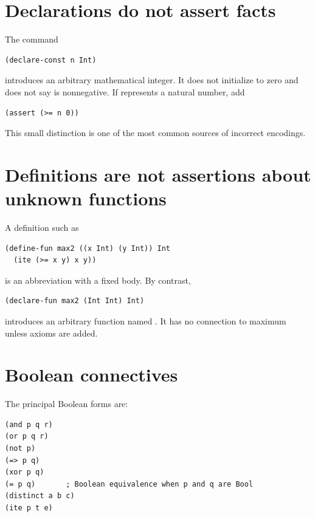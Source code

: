 \documentclass[10pt,letterpaper,oneside]{report}
\newcommand{\code}[1]{\texttt{\detokenize{#1}}}
\begin{document}
\section{Declarations do not assert facts}

The command

\begin{lstlisting}[language=SMTLib]
(declare-const n Int)
\end{lstlisting}

introduces an arbitrary mathematical integer. It does not initialize \code{n} to zero and does not say \code{n} is nonnegative. If \code{n} represents a natural number, add

\begin{lstlisting}[language=SMTLib]
(assert (>= n 0))
\end{lstlisting}

This small distinction is one of the most common sources of incorrect encodings.

\section{Definitions are not assertions about unknown functions}

A definition such as

\begin{lstlisting}[language=SMTLib]
(define-fun max2 ((x Int) (y Int)) Int
  (ite (>= x y) x y))
\end{lstlisting}

is an abbreviation with a fixed body. By contrast,

\begin{lstlisting}[language=SMTLib]
(declare-fun max2 (Int Int) Int)
\end{lstlisting}

introduces an arbitrary function named \code{max2}. It has no connection to maximum unless axioms are added.

\section{Boolean connectives}

The principal Boolean forms are:

\begin{lstlisting}[language=SMTLib]
(and p q r)
(or p q r)
(not p)
(=> p q)
(xor p q)
(= p q)       ; Boolean equivalence when p and q are Bool
(distinct a b c)
(ite p t e)
\end{lstlisting}
\end{document}
